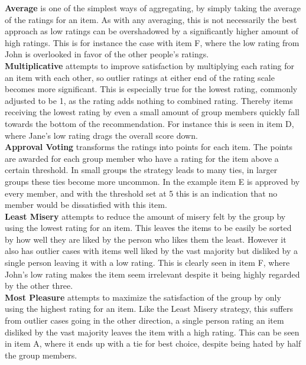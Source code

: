 \textbf{Average} is one of the simplest ways of aggregating, by simply taking the average of the ratings for an item. As with any averaging, this is not necessarily the best approach as low ratings can be overshadowed by a significantly higher amount of high ratings. This is for instance the case with item F, where the low rating from John is overlooked in favor of the other people's ratings.\\

\textbf{Multiplicative} attempts to improve satisfaction by multiplying each rating for an item with each other, so outlier ratings at either end of the rating scale becomes more significant. This is especially true for the lowest rating, commonly adjusted to be 1, as the rating adds nothing to combined rating. Thereby items receiving the lowest rating by even a small amount of group members quickly fall towards the bottom of the recommendation. For instance this is seen in item D, where Jane's low rating drags the overall score down.\\

\textbf{Approval Voting} transforms the ratings into points for each item. The points are awarded for each group member who have a rating for the item above a certain threshold. In small groups the strategy leads to many ties, in larger groups these ties become more uncommon. In the example item E is approved by every member, and with the threshold set at 5 this is an indication that no member would be dissatisfied with this item.\\

\textbf{Least Misery} attempts to reduce the amount of misery felt by the group by using the lowest rating for an item. This leaves the items to be easily be sorted by how well they are liked by the person who likes them the least. However it also has outlier cases with items well liked by the vast majority but disliked by a single person leaving it with a low rating. This is clearly seen in item F, where John's low rating makes the item seem irrelevant despite it being highly regarded by the other three.\\

\textbf{Most Pleasure} attempts to maximize the satisfaction of the group by only using the highest rating for an item. Like the Least Misery strategy, this suffers from outlier cases going in the other direction, a single person rating an item disliked by the vast majority leaves the item with a high rating. This can be seen in item A, where it ends up with a tie for best choice, despite being hated by half the group members.\\

